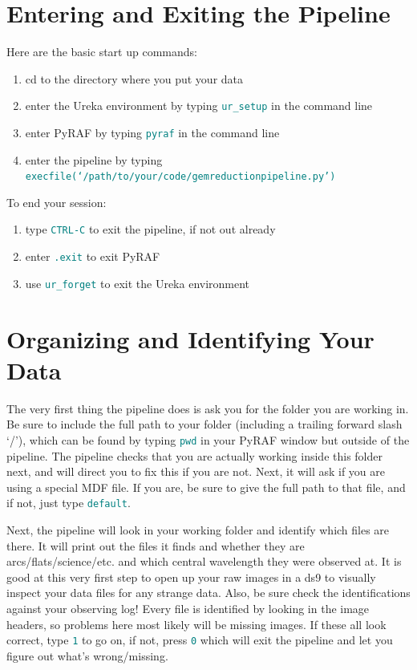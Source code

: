 \documentclass[12pt]{report}
\newcommand{\ty}[1]{\textcolor{teal}{\texttt{#1}}}
\begin{document}
\section{Entering and Exiting the Pipeline}
Here are the basic start up commands: 
\begin{enumerate}
\item cd to the directory where you put your data
\item enter the Ureka environment by typing \ty{ur\_setup} in the command line 
\item enter PyRAF by typing \ty{pyraf} in the command line
\item enter the pipeline by typing \ty{execfile(`/path/to/your/code/gemreductionpipeline.py')}
\end{enumerate}

\noindent To end your session:
\begin{enumerate}
\item type \ty{CTRL-C} to exit the pipeline, if not out already
\item enter \ty{.exit} to exit PyRAF
\item use \ty{ur\_forget} to exit the Ureka environment
\end{enumerate}

\section{Organizing and Identifying Your Data}

\noindent The very first thing the pipeline does is ask you for the folder you are working in. Be sure to include the full path to your folder (including a trailing forward slash `/'), which can be found by typing \ty{pwd} in your PyRAF window but outside of the pipeline. The pipeline checks that you are actually working inside this folder next, and will direct you to fix this if you are not. Next, it will ask if you are using a special MDF file. If you are, be sure to give the full path to that file, and if not, just type \ty{default}.

Next, the pipeline will look in your working folder and identify which files are there. It will print out the files it finds and whether they are arcs/flats/science/etc. and which central wavelength they were observed at. It is good at this very first step to open up your raw images in a ds9 to visually inspect your data files for any strange data. Also, be sure check the identifications against your observing log! Every file is identified by looking in the image headers, so problems here most likely will be missing images. If these all look correct, type \ty{1} to go on, if not, press \ty{0} which will exit the pipeline and let you figure out what's wrong/missing.
\end{document}
